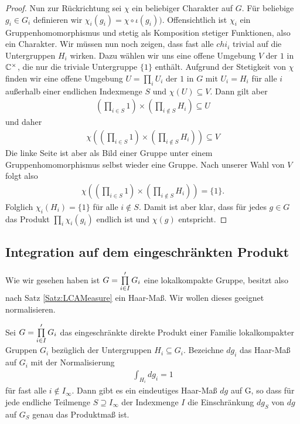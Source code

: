 \begin{proof}
			Nun zur Rückrichtung sei $\chi$ ein beliebiger Charakter auf $G$. 
			Für beliebige $g_i \in G_i$ definieren wir $\chi_i (g_i) = \chi\circ\iota(g_i))$. 
			Offensichtlich ist $\chi_i$ ein Gruppenhomomorphismus und stetig als Komposition stetiger Funktionen, also ein Charakter. 
			Wir müssen nun noch zeigen, dass fast alle $chi_i$ trivial auf die Untergruppen $H_i$ wirken. 
			Dazu wählen wir uns eine offene Umgebung $V$ der $1$ in $\mathbb{C}^\times$, die nur die triviale Untergruppe $\{1\}$ enthält. 
			Aufgrund der Stetigkeit von $\chi$ finden wir eine offene Umgebung $U=\prod_i U_i$ der $1$ in $G$ mit $U_i = H_i$ für alle $i$ außerhalb einer endlichen Indexmenge $S$ und $\chi(U)\subseteq V$.
			Dann gilt aber
			\begin{align*}
				(\prod_{i \in S} 1) \times (\prod_{i \notin S} H_i) \subseteq U 
			\end{align*}
			und daher
			\begin{align*}
				\chi((\prod_{i \in S} 1) \times (\prod_{i \notin S} H_i)) \subseteq V 
			\end{align*}
			Die linke Seite ist aber als Bild einer Gruppe unter einem Gruppenhomomorphismus selbst wieder eine Gruppe. Nach unserer Wahl von $V$ folgt also
			\begin{align*}
				\chi((\prod_{i \in S} 1) \times (\prod_{i \notin S} H_i)) = \{1\}.
			\end{align*}
			Folglich $\chi_i (H_i) = \{1\}$ für alle $i\notin S$. 
			Damit ist aber klar, dass für jedes $g \in G$ das Produkt $\prod_i \chi_i(g_i)$ endlich ist und $\chi(g)$ entspricht.
		\end{proof}
	
\subsection{Integration auf dem eingeschränkten Produkt}
		Wie wir gesehen haben ist $G=\prod\limits_{i \in I}' G_i$ eine lokalkompakte Gruppe, besitzt also nach Satz \ref{Satz:LCAMeasure} ein Haar-Maß. Wir wollen dieses geeignet normalisieren.
		\begin{satz}
			Sei $G=\prod\limits_{i \in I}' G_i$ das eingeschränkte direkte Produkt einer Familie lokalkompakter Gruppen $G_i$ bezüglich der Untergruppen $H_i \subseteq G_i$. Bezeichne $dg_i$ das Haar-Maß auf $G_i$ mit der Normalisierung
			\begin{align*}
				\int_{H_i} dg_i = 1
			\end{align*}
			für fast alle $i \notin I_\infty$. Dann gibt es ein eindeutiges Haar-Maß $dg$ auf G, so dass für jede endliche Teilmenge $S\supseteq I_\infty$ der Indexmenge $I$ die Einschränkung $dg_S$ von $dg$ auf $G_S$ genau das Produktmaß ist.
		\end{satz}
		
